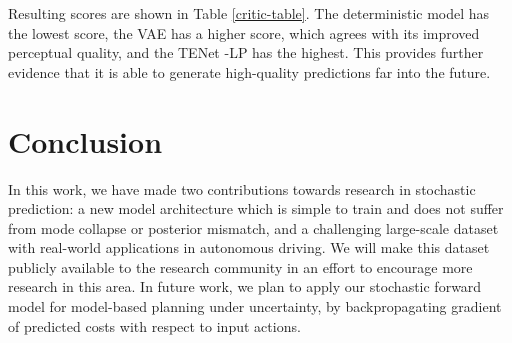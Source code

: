 \documentclass{article}
\newcommand{\modelname}{TENet }
\begin{document}
Resulting scores are shown in Table \ref{critic-table}.
The deterministic model has the lowest score, the VAE has a higher score, which agrees with its improved perceptual quality, and the \modelname-LP has the highest.
This provides further evidence that it is able to generate high-quality predictions far into the future.




\section{Conclusion}

In this work, we have made two contributions towards research in stochastic prediction: a new model architecture which is simple to train and does not suffer from mode collapse or posterior mismatch, and a challenging large-scale dataset with real-world applications in autonomous driving.
We will make this dataset publicly available to the research community in an effort to encourage more research in this area.
In future work, we plan to apply our stochastic forward model for model-based planning under uncertainty, by backpropagating gradient of predicted costs with respect to input actions.










%
%
%
%
%
%
\end{document}
